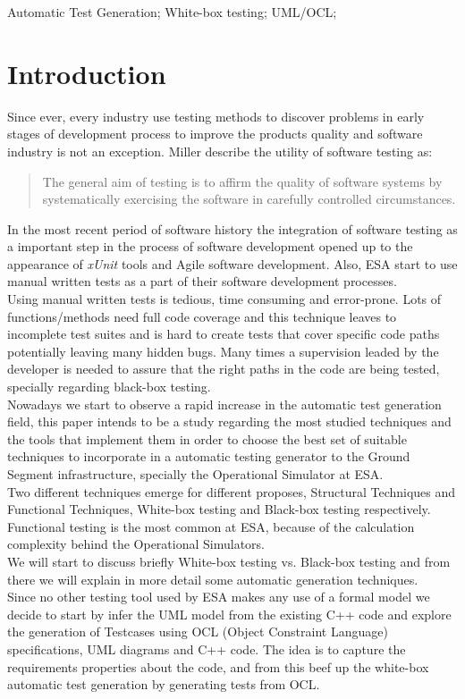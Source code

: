 \documentclass[10pt, conference, compsocconf]{IEEEtran}
\newcommand{\xunit}{\textit{xUnit}}
\begin{document}
\begin{IEEEkeywords}
Automatic Test Generation; White-box testing; UML/OCL;
\end{IEEEkeywords}

\IEEEpeerreviewmaketitle

\section{Introduction}
Since ever, every industry use testing methods to discover problems in early stages of development process to improve
the products quality and software industry is not an exception. Miller\cite{miller} describe the utility
of software testing as:

\begin{quotation}
The general aim of testing is to affirm the quality of software systems by systematically
exercising the software in carefully controlled circumstances.
\end{quotation}

In the most recent period of software history the integration of software testing as a important step in the process of
software development opened up to the appearance of \xunit\cite{xunit} tools and Agile software development.
Also, ESA start to use manual written tests as a part of their software development processes.\\
Using  manual written tests is tedious, time consuming and error-prone. Lots of functions/methods need full code coverage and this technique leaves
to incomplete test suites and is hard to create tests that cover specific code paths potentially leaving many hidden bugs. Many times a supervision leaded by the developer
is needed to assure that the right paths in the code are being tested, specially regarding black-box testing.\\
Nowadays we start to observe a rapid increase in the automatic test generation field, this paper intends to be a study regarding the most studied techniques
and the tools that implement them in order to choose the best set of suitable techniques to incorporate in a automatic testing generator to the
Ground Segment infrastructure, specially the Operational Simulator at ESA.\\
Two different techniques emerge for different proposes, Structural Techniques and Functional Techniques,
White-box testing and Black-box\cite{black} testing respectively. Functional testing is the most common at ESA, because of the calculation complexity
behind the Operational Simulators.\\
We will start to discuss briefly White-box testing vs. Black-box testing and from there we will explain in more detail some automatic generation techniques.\\
\indent Since no other testing tool used by ESA makes any use of a formal model we decide to start by infer the UML model from the existing C++
code and explore the generation of Testcases using OCL (Object Constraint Language) specifications, UML diagrams and C++ code.
The idea is to capture the requirements properties about the code, and from this beef up the white-box automatic test generation by generating tests from OCL.
\end{document}
